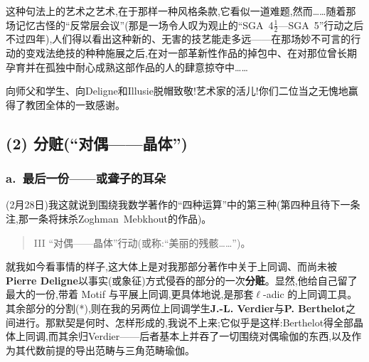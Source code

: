 这种句法上的艺术之艺术,在于那样一种风格条款,它看似一道难题,然而……随着那场记忆古怪的“反常层会议”(那是一场令人叹为观止的“SGA~4$\frac{1}{2}$—SGA~5”行动之后不过四年),人们得以看出这种新的、无害的技艺能走多远——在那场妙不可言的行动的变戏法绝技的种种施展之后,在对一部革新性作品的掉包中、在对那位曾长期孕育并在孤独中耐心成熟这部作品的人的肆意掠夺中……

向师父和学生、向Deligne和Illusie脱帽致敬!艺术家的活儿!你们二位当之无愧地赢得了教团全体的一致感谢。

\subsection{(2) 分赃(“对偶——晶体”)}



\subsubsection*{a.~最后一份——或聋子的耳朵}



(2月28日)我这就说到围绕我数学著作的“四种运算”中的第三种(第四种且待下一条注,那一条将抹杀Zoghman~Mebkhout的作品)。

\begin{quote}
III “对偶——晶体”行动(或称:“美丽的残骸……”)。
\end{quote}

就我如今看事情的样子,这大体上是对我那部分著作中关于上同调、而尚未被\textbf{Pierre Deligne}以事实(或象征)方式侵吞的部分的一次\textbf{分赃}。显然,他给自己留了最大的一份,带着 Motif 与平展上同调,更具体地说,是那套$\ell$-adic 的上同调工具。其余部分的分割(*),则在我的另两位上同调学生\dmark{}\textbf{J.-L. Verdier}与\textbf{P. Berthelot}之间进行。那默契是何时、怎样形成的,我说不上来;它似乎是这样:Berthelot得全部晶体上同调,而其余归Verdier——后者基本上并吞了一切围绕对偶瑜伽的东西,以及作为其代数前提的导出范畴与三角范畴瑜伽。

